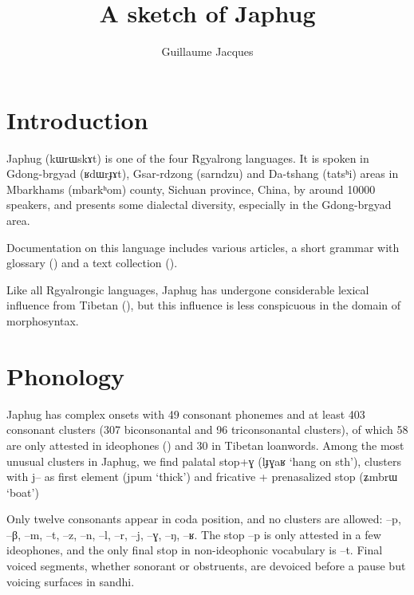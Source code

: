 \documentclass[oldfontcommands,oneside,a4paper,11pt]{article}
\newcommand{\ipa}[1]{{\phon#1}} %
\begin{document}
 

\title{A sketch of Japhug}
\author{Guillaume Jacques}
\maketitle


\section{Introduction}
Japhug (\ipa{kɯrɯskɤt}) is one of the four Rgyalrong languages. It is spoken in Gdong-brgyad (\ipa{ʁdɯrɟɤt}), Gsar-rdzong (\ipa{sarndzu}) and Da-tshang (\ipa{tatsʰi}) areas in Mbarkhams (\ipa{mbarkʰom}) county, Sichuan province, China, by around 10000 speakers, and presents some dialectal diversity, especially in the Gdong-brgyad area.

Documentation on this language includes various articles, a short grammar with glossary (\citealt{jacques08}) and a text collection (\citealt{jacques10gesar}).

Like all Rgyalrongic languages, Japhug has undergone considerable lexical influence from Tibetan (\citealt{jacques04these}), but this influence is less conspicuous in the domain of morphosyntax.



\section{Phonology}
Japhug has complex onsets with 49 consonant phonemes and at least 403 consonant clusters (307 biconsonantal and 96 triconsonantal clusters), of which 58 are only attested in ideophones (\citealt{japhug14ideophones}) and 30 in Tibetan loanwords. Among the most unusual clusters in Japhug, we find palatal stop+\ipa{ɣ} (\ipa{lɟɣaʁ} `hang on sth'), clusters with \ipa{j--} as first element (\ipa{jpum} `thick') and fricative + prenasalized stop (\ipa{ʑmbrɯ} `boat')


Only twelve   consonants appear in coda position, and no clusters are allowed:  \ipa{--p}, \ipa{--β}, \ipa{--m}, \ipa{--t}, \ipa{--z}, \ipa{--n}, \ipa{--l}, \ipa{--r}, \ipa{--j}, \ipa{--ɣ}, \ipa{--ŋ}, \ipa{--ʁ}. The stop \ipa{--p} is only attested in a few ideophones, and the only final stop in non-ideophonic vocabulary is \ipa{--t}. Final voiced segments, whether sonorant or obstruents, are devoiced before a pause but voicing surfaces in sandhi.
\end{document}
